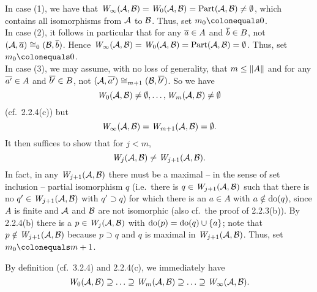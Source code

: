 \begin{enumerate}[1.]
\begin{enumerate}[(1)]
\end{enumerate}
In case (1), we have that $\winpos{\infty}(\strct{A}, \strct{B}) = \winpos{0}(\strct{A}, \strct{B}) = \partisoms(\strct{A}, \strct{B}) \neq \emptyset$, which contains all isomorphisms from $\mathcal{A}$ to $\mathcal{B}$. Thus, set $m_0 \defas 0$.
\medskip\\
In case (2), it follows in particular that for any $\overline{a} \in A$ and $\overline{b} \in B$, not $(\strct{A}, \vect{a}) \isom_0 (\strct{B}, \vect{b})$. Hence $\winpos{\infty}(\strct{A}, \strct{B}) = \winpos{0}(\strct{A}, \strct{B}) = \partisoms(\strct{A}, \strct{B}) = \emptyset$. Thus, set $m_0 \defas 0$.
\medskip\\
In case (3), we may assume, with no loss of generality, that $m \leq \|A\|$ and for any $\overline{a'} \in A$ and $\overline{b'} \in B$, not $(\strct{A}, \vect{a'}) \isom_{m + 1} (\strct{B}, \vect{b'})$. So we have
\[
\winpos{0}(\strct{A}, \strct{B}) \neq \emptyset, \etc, \winpos{m}(\strct{A}, \strct{B}) \neq \emptyset
\]
(cf.\ 2.2.4(c)) but
\[
\winpos{\infty}(\strct{A}, \strct{B}) = \winpos{m + 1}(\strct{A}, \strct{B}) = \emptyset.
\]
It then suffices to show that for $j < m$, 
\[
\winpos{j}(\strct{A}, \strct{B}) \neq \winpos{j + 1}(\strct{A}, \strct{B}).
\]
In fact, in any $\winpos{j + 1}(\strct{A}, \strct{B})$ there must be a maximal -- in the sense of set inclusion -- partial isomorphism $q$ (i.e.\ there is $q \in \winpos{j + 1}(\strct{A}, \strct{B})$ such that there is no $q' \in \winpos{j + 1}(\strct{A}, \strct{B})$ with $q' \supset q$) for which there is an $a \in A$ with $a \notin \mathrm{do}(q)$, since $A$ is finite and $\mathcal{A}$ and $\mathcal{B}$ are not isomorphic (also cf.\ the proof of 2.2.3(b)). By 2.2.4(b) there is a $p \in \winpos{j}(\strct{A}, \strct{B})$ with $\mathrm{do}(p) = \mathrm{do}(q) \cup {\{a\}}$; note that $p \notin \winpos{j + 1}(\strct{A}, \strct{B})$ because $p \supset q$ and $q$ is maximal in $\winpos{j + 1}(\strct{A}, \strct{B})$. Thus, set $m_0 \defas m + 1$.
\begin{remark}
By definition (cf.\ 3.2.4) and 2.2.4(c), we immediately have
\[
\winpos{0}(\strct{A}, \strct{B}) \supseteq \etc \supseteq \winpos{m}(\strct{A}, \strct{B}) \supseteq \etc \supseteq \winpos{\infty}(\strct{A}, \strct{B}).
\]
\end{remark}
%
\end{enumerate}


